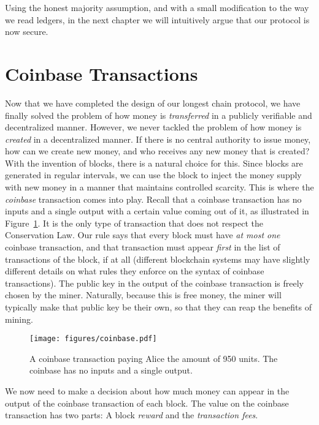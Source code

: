 Using the honest majority assumption, and with a small modification to the way we read ledgers,
in the next chapter we will intuitively argue that our protocol is now secure.

\section{Coinbase Transactions}

Now that we have completed the design of our longest chain protocol, we have finally solved the
problem of how money is \emph{transferred} in a publicly verifiable and decentralized manner.
However, we never tackled the problem of how money is \emph{created} in a decentralized manner.
If there is no central authority to issue money, how can we create new money, and who receives
any new money that is created? With the invention of blocks, there is a natural choice for this.
Since blocks are generated in regular intervals, we can use the block to inject the money supply
with new money in a manner that maintains controlled scarcity.
This is where the \emph{coinbase} transaction comes into play.
Recall that a coinbase transaction has no inputs and a single output with a certain value coming
out of it, as illustrated in Figure~\ref{fig.coinbase}.
It is the only type of transaction that does not respect the Conservation Law.
Our rule says that every block
must have \emph{at most one} coinbase transaction, and that transaction must appear \emph{first} in
the list of transactions of the block, if at all (different blockchain systems may have slightly
different details on what rules they enforce on the syntax of coinbase transactions).
The public key in the output of the coinbase transaction is freely chosen by the miner.
Naturally, because this is free money, the miner will typically make that public key
be their own, so that they can reap the benefits of mining.

\begin{figure}[h]
    \centering
    \texttt{[image: figures/coinbase.pdf]}
    \caption{A coinbase transaction paying Alice the amount of 950 units. The coinbase has no inputs and a single output.}
    \label{fig.coinbase}
\end{figure}

We now need to make a decision about how much money can appear in the output of the coinbase
transaction of each block. The value on the coinbase transaction has two parts: A block \emph{reward}
and the \emph{transaction fees}.

